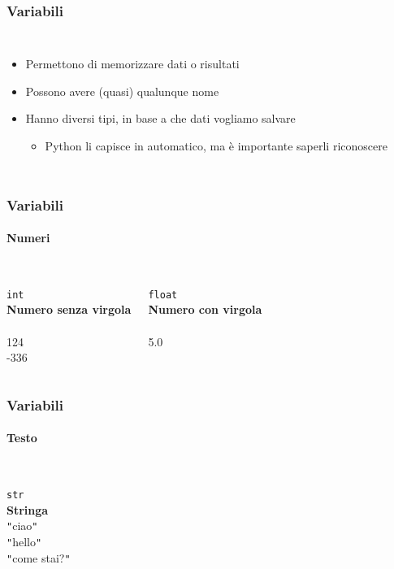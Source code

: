 \begin{contentframe}
    \frametitle{Variabili}

    \begin{columns}
        \begin{itemize}
            \item Permettono di memorizzare dati o risultati

            \bigskip
            \item Possono avere (quasi) qualunque nome
            
            \bigskip
            \item Hanno diversi tipi, in base a che dati vogliamo salvare
            \begin{itemize}
                \item Python li capisce in automatico, ma è importante saperli riconoscere
            \end{itemize}
        \end{itemize}
        
        \centering
    \end{columns}
\end{contentframe}

\begin{contentframe}
    \frametitle{Variabili}
    \framesubtitle{Numeri}

    \begin{columns}
        \centering
        {\Huge\faCalculator}\\
        \bigskip
        \texttt{int}\\
        \textbf{Numero senza virgola}\\
        \\124\\-336

        \centering
        {\Huge\faCalculator}\\
        \bigskip
        \texttt{float}\\
        \textbf{Numero con virgola}\\
        \\5.0\\\bigskip
    \end{columns}
\end{contentframe}

\begin{contentframe}
    \frametitle{Variabili}
    \framesubtitle{Testo}

    \begin{columns}
        \centering
        {\Huge\faPen}\\
        \bigskip
        \texttt{str}\\
        \textbf{Stringa}\\
        \bigskip
        \texttt{"}ciao\texttt{"}\\
        \texttt{"}hello\texttt{"}\\
        \texttt{"}come stai?\texttt{"}
    \end{columns}
\end{contentframe}

